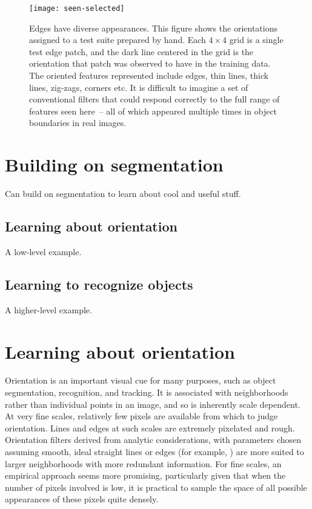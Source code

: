 
\begin{figure}[bt]
\texttt{[image: seen-selected]}
\caption
{
\label{fig:seen-selected}
%
Edges have diverse appearances.  This figure shows 
the orientations assigned to a test suite
prepared by hand.  Each $4\times 4$ grid is a single test
edge patch, and the dark line centered in the grid is the orientation
that patch was observed to have in the training data.
The oriented features represented
include edges, thin lines, thick lines, zig-zags, corners
etc.  It is difficult to imagine a set of conventional
filters that could respond correctly to the full range of 
features seen here~-- all of which appeared multiple
times in object boundaries in real images.
%
}
\end{figure}


\section{Building on segmentation}

Can build on segmentation to learn about cool and useful stuff.

\subsection*{Learning about orientation}

A low-level example.

\subsection*{Learning to recognize objects}

A higher-level example.



\section{Learning about orientation}

Orientation is an important visual cue for many purposes, such as
object segmentation, recognition, and tracking.  It is associated with
neighborhoods rather than individual points in an image, and so is
inherently scale dependent.  At very fine scales, relatively few
pixels are available from which to judge orientation.
Lines and edges at such scales are extremely pixelated and
rough.
%
Orientation filters derived from analytic considerations, with
parameters chosen assuming smooth, ideal straight lines or edges (for
example, \cite{chen00orientation}) are more suited to larger
neighborhoods with more redundant information.
For fine scales, an empirical approach seems more promising, particularly
given that when the number of pixels involved is low, it is practical
to sample the space of all possible appearances of these pixels 
quite densely.

